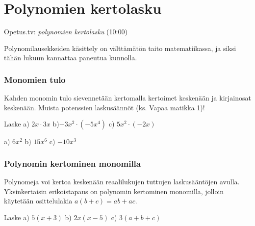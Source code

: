 \section{Polynomien kertolasku}

{Opetus.tv: \emph{polynomien kertolasku} (10:00)}

Polynomilausekkeiden käsittely on välttämätön taito matematiikassa, ja siksi tähän lukuun kannattaa paneutua kunnolla.

\subsubsection*{Monomien tulo}

Kahden monomin tulo sievennetään kertomalla kertoimet keskenään ja kirjainosat keskenään. Muista potenssien laskusäännöt (ks. Vapaa matikka 1)!

\begin{esimerkki}
    Laske \quad 
    a) $2x\cdot 3x$ \quad
    b)$-3x^2\cdot (-5x^4)$ \quad
    c) $5x^2 \cdot (-2x)$
    \begin{esimratk}
        \begin{alakohdat}
        \end{alakohdat}
    \end{esimratk}
    \begin{esimvast}
        a) $6x^2$ \quad
        b) $15x^6$ \quad
        c) $-10x^3$
    \end{esimvast}
\end{esimerkki}

\subsubsection*{Polynomin kertominen monomilla}

Polynomeja voi kertoa keskenään reaalilukujen tuttujen laskusääntöjen avulla. Yksinkertaisin erikoistapaus on polynomin kertominen monomilla, jolloin
käytetään osittelulakia $a(b+c)=ab+ac$.

\begin{esimerkki}
Laske \quad a) $5(x+3)$ \quad b) $2x(x-5)$ \quad 
c) $3(a+b+c)$
\begin{alakohdat}
\end{alakohdat}
\end{esimerkki} 

